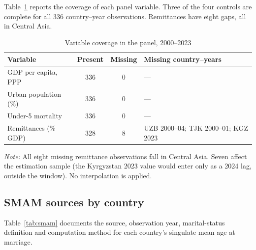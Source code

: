 Table~\ref{tab:missingness} reports the coverage of each panel variable. Three of the four controls are complete for all 336 country--year observations. Remittances have eight gaps, all in Central Asia.

\begin{table}[htbp]
\centering
\caption{Variable coverage in the panel, 2000--2023}
\label{tab:missingness}
\small
\begin{tabular}{lccl}
\toprule
Variable & Present & Missing & Missing country--years \\
\midrule
GDP per capita, PPP & 336 & 0 & --- \\
Urban population (\%) & 336 & 0 & --- \\
Under-5 mortality & 336 & 0 & --- \\
Remittances (\% GDP) & 328 & 8 & UZB 2000--04; TJK 2000--01; KGZ 2023 \\
\bottomrule
\end{tabular}

\begin{minipage}{\textwidth}\footnotesize
\vspace{4pt}
\emph{Note:} All eight missing remittance observations fall in Central Asia. Seven affect the estimation sample (the Kyrgyzstan 2023 value would enter only as a 2024 lag, outside the window). No interpolation is applied.
\end{minipage}
\end{table}

\subsection{SMAM sources by country}
\label{app:smam}

Table~\ref{tab:smam} documents the source, observation year, marital-status definition and computation method for each country's singulate mean age at marriage.

